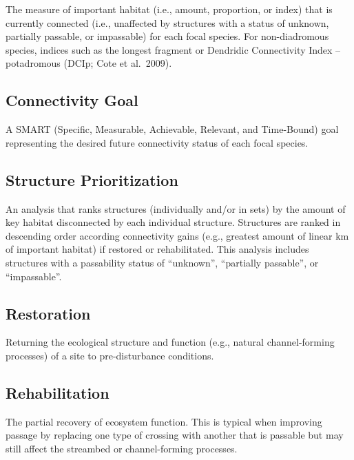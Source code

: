 \documentclass[
  letterpaper,
  DIV=11,
  numbers=noendperiod]{scrreprt}
\begin{document}
The measure of important habitat (i.e., amount, proportion, or index)
that is currently connected (i.e., unaffected by structures with a
status of unknown, partially passable, or impassable) for each focal
species. For non-diadromous species, indices such as the longest
fragment or Dendridic Connectivity Index -- potadromous (DCIp; Cote et
al.~2009).

\hypertarget{connectivity-goal}{%
\subsection*{Connectivity Goal}\label{connectivity-goal}}

A SMART (Specific, Measurable, Achievable, Relevant, and Time-Bound)
goal representing the desired future connectivity status of each focal
species.

\hypertarget{structure-prioritization}{%
\subsection*{Structure Prioritization}\label{structure-prioritization}}

An analysis that ranks structures (individually and/or in sets) by the
amount of key habitat disconnected by each individual structure.
Structures are ranked in descending order according connectivity gains
(e.g., greatest amount of linear km of important habitat) if restored or
rehabilitated. This analysis includes structures with a passability
status of ``unknown'', ``partially passable'', or ``impassable''.

\hypertarget{restoration}{%
\subsection*{Restoration}\label{restoration}}

Returning the ecological structure and function (e.g., natural
channel-forming processes) of a site to pre-disturbance conditions.

\hypertarget{rehabilitation}{%
\subsection*{Rehabilitation}\label{rehabilitation}}

The partial recovery of ecosystem function. This is typical when
improving passage by replacing one type of crossing with another that is
passable but may still affect the streambed or channel-forming
processes.
\end{document}
